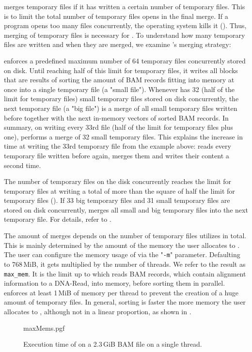 \sort merges temporary files if it has written a certain number of temporary files. This is to limit the total number of temporary files \sort opens in the final merge. If a program opens too many files concurrently, the operating system kills it (). Thus, merging of temporary files is necessary for \sort.
To understand how many temporary files are written and when they are merged, we examine \sort's merging strategy: 

\sort enforces a predefined maximum number of 64 temporary files concurrently stored on disk. Until reaching half of this limit for temporary files, it writes all blocks that are results of sorting the amount of BAM records fitting into memory at once into a single temporary file (a "small file"). Whenever \sort has 32  (half of the limit for temporary files) small temporary files stored on disk concurrently, the next temporary file (a "big file") is a merge of all small temporary files written before together with the next in-memory vectors of sorted BAM records. In summary, on writing every 33rd file (half of the limit for temporary files plus one), \sort performs a merge of 32 small temporary files. This explains the increase in time at writing the 33rd temporary file from the example above: \sort reads every temporary file written before again, merges them and writes their content a second time. 

The number of temporary files on the disk concurrently reaches the limit for temporary files at writing a total of more than the square of half the limit for temporary files (). If 33 big temporary files and 31 small temporary files are stored on disk concurrently, \sort merges all small and big temporary files into the next temporary file. For details, refer to . 

The amount of merges depends on the number of temporary files \sort utilizes in total. This is mainly determined by the amount of the memory the user allocates to \sort. The user can configure the memory usage of \sort via the "\texttt{-m}" parameter. Defaulting to 768\,MiB, it gets multiplied by the number of threads. We refer to the result as \texttt{max\_mem}. It is the limit up to which \sort reads BAM records, which contain alignment information to a DNA-Read, into memory, before sorting them in parallel. 
\sort enforces at least 1\,MiB of memory per thread to prevent the creation of a huge amount of temporary files. In general, sorting is faster the more memory the user allocates to \sort, although not in a linear proportion, as shown in .
\begin{figure}
        {maxMems.pgf}
    \caption{Execution time of \sort on a 2.3\,GiB BAM file on a single thread. \points}
    \label{fig:maxMems}
\end{figure}

